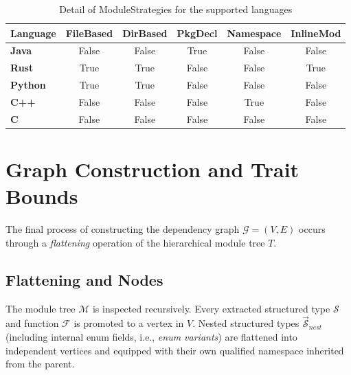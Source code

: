 \begin{table}[h]
  \centering
  \begin{tabular}{|l|c|c|c|c|c|}
    \hline
    \textbf{Language} & \textbf{FileBased} & \textbf{DirBased} &
    \textbf{PkgDecl} & \textbf{Namespace} & \textbf{InlineMod} \\ \hline
    \textbf{Java} & False & False & True & False & False \\ \hline
    \textbf{Rust} & True & True & False & False & True \\ \hline
    \textbf{Python} & True & True & False & False & False \\ \hline
    \textbf{C++} & False & False & False & True & False \\ \hline
    \textbf{C} & False & False & False & False & False \\ \hline
  \end{tabular}
  \caption{Detail of ModuleStrategies for the supported languages}
  \label{tab:lang_config_modules}
\end{table}

\section{Graph Construction and Trait Bounds}
The final process of constructing the dependency graph $\mathcal{G} =
(V, E)$ occurs through a \textit{flattening} operation of the
hierarchical module tree $T$.

\subsection{Flattening and Nodes}
The module tree $\mathcal{M}$ is inspected recursively. Every
extracted structured type $\mathcal{S}$ and function $\mathcal{F}$ is
promoted to a vertex in $V$. Nested structured types
$\vec{\mathcal{S}}_{nest}$ (including internal enum fields, i.e.,
\textit{enum variants}) are flattened into independent vertices and
equipped with their own qualified namespace inherited from the parent.

